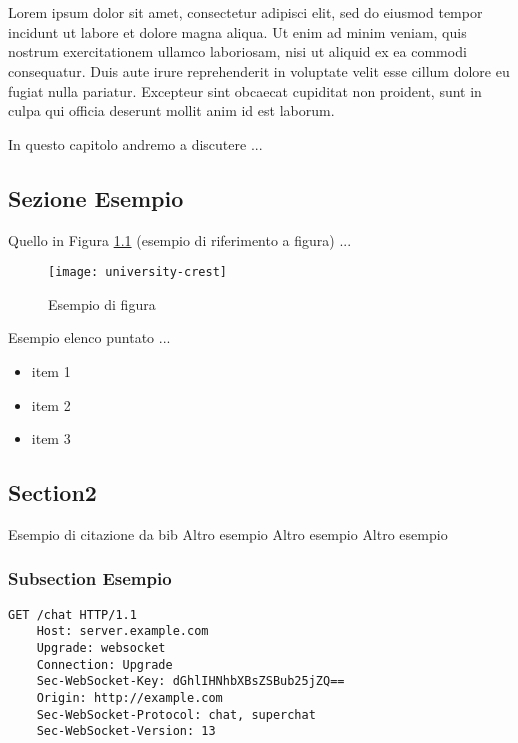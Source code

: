 \chapter{}
\label{chap:3-inference}

\nocite{html5}

Lorem ipsum dolor sit amet, consectetur adipisci elit, sed do eiusmod tempor incidunt ut labore et dolore magna aliqua. Ut enim ad minim veniam, quis nostrum exercitationem ullamco laboriosam, nisi ut aliquid ex ea commodi consequatur. Duis aute irure reprehenderit in voluptate velit esse cillum dolore eu fugiat nulla pariatur. Excepteur sint obcaecat cupiditat non proident, sunt in culpa qui officia deserunt mollit anim id est laborum.

In questo capitolo andremo a discutere ...
  
\section{Sezione Esempio}
\label{sec:real-time}
Quello in Figura \ref{fig:rocker}  (esempio di riferimento a figura) ...

\begin{figure}[htpb!]
  \centering
  \texttt{[image: university-crest]}
  \caption{Esempio di figura}
  \label{fig:rocker}
\end{figure}

Esempio elenco puntato ...
\begin{itemize}
\item item 1
\item item 2
\item item 3
\end{itemize}


\section{Section2}


Esempio di citazione da bib \cite{MP}
Altro esempio \cite{trello}
Altro esempio \cite{paperopoli}
Altro esempio \cite{ajax}

\subsection{Subsection Esempio}
\label{sec:handshake}

\begin{lstlisting}[caption={Esempio di listing}, style=javaScriptCode]
	GET /chat HTTP/1.1
	Host: server.example.com
	Upgrade: websocket
	Connection: Upgrade
	Sec-WebSocket-Key: dGhlIHNhbXBsZSBub25jZQ==
	Origin: http://example.com
	Sec-WebSocket-Protocol: chat, superchat
	Sec-WebSocket-Version: 13
\end{lstlisting} 


